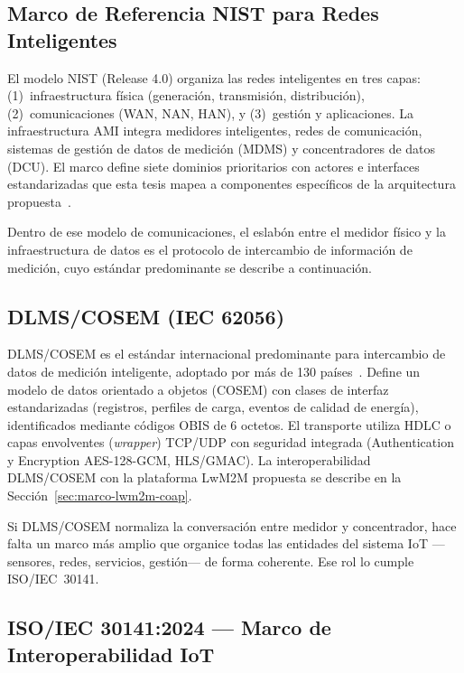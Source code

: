 \subsection{Marco de Referencia NIST para Redes Inteligentes}
\label{sec:marco-nist-framework}

El modelo NIST (Release 4.0) organiza las redes inteligentes en tres capas: (1)~infraestructura física (generación, transmisión, distribución), (2)~comunicaciones (WAN, NAN, HAN), y (3)~gestión y aplicaciones. La infraestructura AMI integra medidores inteligentes, redes de comunicación, sistemas de gestión de datos de medición (MDMS) y concentradores de datos (DCU). El marco define siete dominios prioritarios con actores e interfaces estandarizadas que esta tesis mapea a componentes específicos de la arquitectura propuesta~\cite{NISTFramework2022}.

Dentro de ese modelo de comunicaciones, el eslabón entre el medidor físico y la infraestructura de datos es el protocolo de intercambio de información de medición, cuyo estándar predominante se describe a continuación.

\subsection{DLMS/COSEM (IEC 62056)}
\label{sec:marco-dlms-cosem}

DLMS/COSEM es el estándar internacional predominante para intercambio de datos de medición inteligente, adoptado por más de 130 países~\cite{dlmsCOSEMArchitecture2023}. Define un modelo de datos orientado a objetos (COSEM) con clases de interfaz estandarizadas (registros, perfiles de carga, eventos de calidad de energía), identificados mediante códigos OBIS de 6 octetos. El transporte utiliza HDLC o capas envolventes (\emph{wrapper}) TCP/UDP con seguridad integrada (Authentication y Encryption AES-128-GCM, HLS/GMAC). La interoperabilidad DLMS/COSEM con la plataforma LwM2M propuesta se describe en la Sección~\ref{sec:marco-lwm2m-coap}.

Si DLMS/COSEM normaliza la conversación entre medidor y concentrador, hace falta un marco más amplio que organice todas las entidades del sistema IoT ---sensores, redes, servicios, gestión--- de forma coherente. Ese rol lo cumple ISO/IEC~30141.

\subsection{ISO/IEC 30141:2024 --- Marco de Interoperabilidad IoT}
\label{sec:marco-iso-iec-30141}

